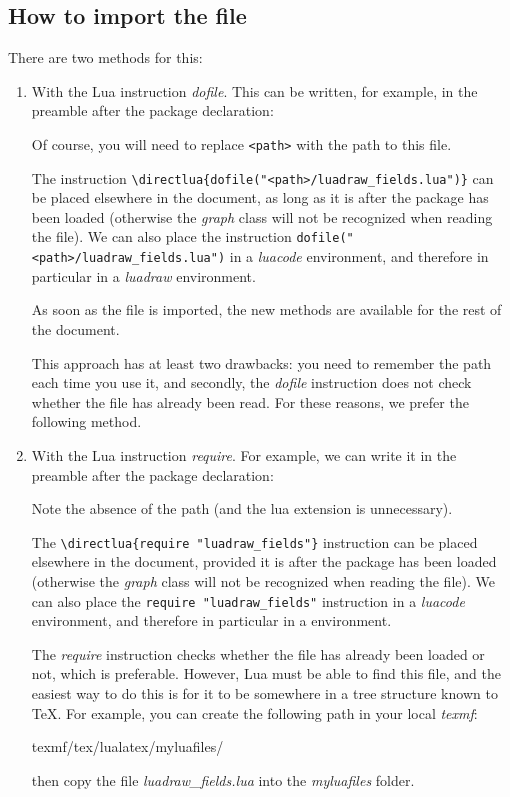 \subsection{How to import the file}

There are two methods for this:

\begin{enumerate}
\item With the Lua instruction \emph{dofile}. This can be written, for example, in the preamble after the package declaration:
\begin{TeXcode}
\usepackage[]{luadraw}
\end{TeXcode}
Of course, you will need to replace \verb|<path>| with the path to this file.

The instruction \verb|\directlua{dofile("<path>/luadraw_fields.lua")}| can be placed elsewhere in the document, as long as it is after the package has been loaded (otherwise the \emph{graph} class will not be recognized when reading the file). We can also place the instruction \verb|dofile("<path>/luadraw_fields.lua")| in a \emph{luacode} environment, and therefore in particular in a \emph{luadraw} environment.

As soon as the file is imported, the new methods are available for the rest of the document.

This approach has at least two drawbacks: you need to remember the path each time you use it, and secondly, the \emph{dofile} instruction does not check whether the file has already been read. For these reasons, we prefer the following method.

\item With the Lua instruction \emph{require}. For example, we can write it in the preamble after the package declaration:
\begin{TeXcode}
\usepackage[]{luadraw}
\end{TeXcode}
Note the absence of the path (and the lua extension is unnecessary).

The \verb|\directlua{require "luadraw_fields"}| instruction can be placed elsewhere in the document, provided it is after the package has been loaded (otherwise the \emph{graph} class will not be recognized when reading the file). We can also place the \verb|require "luadraw_fields"| instruction in a \emph{luacode} environment, and therefore in particular in a \luadrawenv environment.

The \emph{require} instruction checks whether the file has already been loaded or not, which is preferable. However, Lua must be able to find this file, and the easiest way to do this is for it to be somewhere in a tree structure known to TeX. For example, you can create the following path in your local \emph{texmf}:
\begin{TeXcode}
texmf/tex/lualatex/myluafiles/
\end{TeXcode}
then copy the file \emph{luadraw\_fields.lua} into the \emph{myluafiles} folder.
\end{enumerate}

